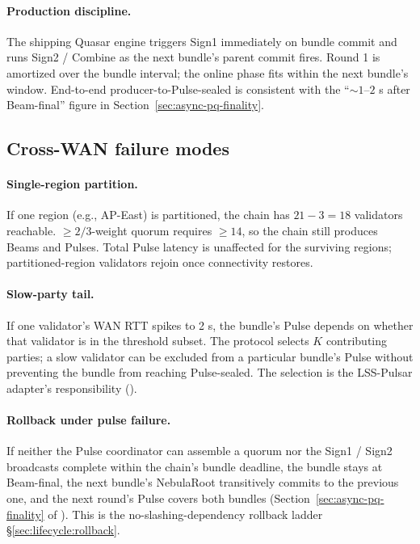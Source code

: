 \paragraph{Production discipline.} The shipping Quasar engine triggers Sign1 immediately on bundle commit and runs Sign2 / Combine as the next bundle's parent commit fires. Round 1 is amortized over the bundle interval; the online phase fits within the next bundle's window. End-to-end producer-to-Pulse-sealed is consistent with the ``$\sim 1$--$2$ s after Beam-final'' figure in \cite{luxquasarhorizon} Section~\ref{sec:async-pq-finality}.

\subsection{Cross-WAN failure modes}

\paragraph{Single-region partition.} If one region (e.g., AP-East) is partitioned, the chain has $21 - 3 = 18$ validators reachable. $\geq 2/3$-weight quorum requires $\geq 14$, so the chain still produces Beams and Pulses. Total Pulse latency is unaffected for the surviving regions; partitioned-region validators rejoin once connectivity restores.

\paragraph{Slow-party tail.} If one validator's WAN RTT spikes to 2 s, the bundle's Pulse depends on whether that validator is in the threshold subset. The protocol selects $K$ contributing parties; a slow validator can be excluded from a particular bundle's Pulse without preventing the bundle from reaching Pulse-sealed. The selection is the LSS-Pulsar adapter's responsibility (\cite{luxlssmpc}).

\paragraph{Rollback under pulse failure.} If neither the Pulse coordinator can assemble a quorum nor the Sign1 / Sign2 broadcasts complete within the chain's bundle deadline, the bundle stays at Beam-final, the next bundle's NebulaRoot transitively commits to the previous one, and the next round's Pulse covers both bundles (Section~\ref{sec:async-pq-finality} of \cite{luxquasarhorizon}). This is the no-slashing-dependency rollback ladder \cite{luxpulsar} \S\ref{sec:lifecycle:rollback}.

